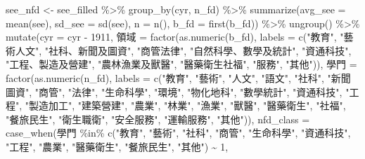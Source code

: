 \documentclass[
]{article}
\newenvironment{Shaded}{\begin{snugshade}}{\end{snugshade}}
\newcommand{\AttributeTok}[1]{\textcolor[rgb]{0.77,0.63,0.00}{#1}}
\newcommand{\DecValTok}[1]{\textcolor[rgb]{0.00,0.00,0.81}{#1}}
\newcommand{\FunctionTok}[1]{\textcolor[rgb]{0.00,0.00,0.00}{#1}}
\newcommand{\NormalTok}[1]{#1}
\newcommand{\OtherTok}[1]{\textcolor[rgb]{0.56,0.35,0.01}{#1}}
\newcommand{\SpecialCharTok}[1]{\textcolor[rgb]{0.00,0.00,0.00}{#1}}
\newcommand{\StringTok}[1]{\textcolor[rgb]{0.31,0.60,0.02}{#1}}
\begin{document}
\begin{Shaded}
\begin{Highlighting}[]
\NormalTok{see\_nfd }\OtherTok{\textless{}{-}}\NormalTok{ see\_filled }\SpecialCharTok{\%\textgreater{}\%}
  \FunctionTok{group\_by}\NormalTok{(cyr, n\_fd) }\SpecialCharTok{\%\textgreater{}\%}
  \FunctionTok{summarize}\NormalTok{(}\AttributeTok{avg\_see =} \FunctionTok{mean}\NormalTok{(see),}
            \AttributeTok{sd\_see =} \FunctionTok{sd}\NormalTok{(see),}
            \AttributeTok{n =} \FunctionTok{n}\NormalTok{(),}
            \AttributeTok{b\_fd =} \FunctionTok{first}\NormalTok{(b\_fd)) }\SpecialCharTok{\%\textgreater{}\%}
  \FunctionTok{ungroup}\NormalTok{() }\SpecialCharTok{\%\textgreater{}\%}
  \FunctionTok{mutate}\NormalTok{(}\AttributeTok{cyr =}\NormalTok{ cyr }\SpecialCharTok{{-}} \DecValTok{1911}\NormalTok{,}
\NormalTok{         領域 }\OtherTok{=} \FunctionTok{factor}\NormalTok{(}\FunctionTok{as.numeric}\NormalTok{(b\_fd), }\AttributeTok{labels =} \FunctionTok{c}\NormalTok{(}\StringTok{"教育"}\NormalTok{, }\StringTok{"藝術人文"}\NormalTok{, }\StringTok{"社科、新聞及圖資"}\NormalTok{, }\StringTok{"商管法律"}\NormalTok{, }\StringTok{"自然科學、數學及統計"}\NormalTok{, }\StringTok{"資通科技"}\NormalTok{, }\StringTok{"工程、製造及營建"}\NormalTok{, }\StringTok{"農林漁業及獸醫"}\NormalTok{, }\StringTok{"醫藥衛生社福"}\NormalTok{, }\StringTok{"服務"}\NormalTok{, }\StringTok{"其他"}\NormalTok{)),}
\NormalTok{         學門 }\OtherTok{=} \FunctionTok{factor}\NormalTok{(}\FunctionTok{as.numeric}\NormalTok{(n\_fd), }\AttributeTok{labels =} \FunctionTok{c}\NormalTok{(}\StringTok{"教育"}\NormalTok{, }\StringTok{"藝術"}\NormalTok{, }\StringTok{"人文"}\NormalTok{, }\StringTok{"語文"}\NormalTok{, }\StringTok{"社科"}\NormalTok{, }\StringTok{"新聞圖資"}\NormalTok{, }\StringTok{"商管"}\NormalTok{, }\StringTok{"法律"}\NormalTok{, }\StringTok{"生命科學"}\NormalTok{, }\StringTok{"環境"}\NormalTok{, }\StringTok{"物化地科"}\NormalTok{, }\StringTok{"數學統計"}\NormalTok{, }\StringTok{"資通科技"}\NormalTok{, }\StringTok{"工程"}\NormalTok{, }\StringTok{"製造加工"}\NormalTok{, }\StringTok{"建築營建"}\NormalTok{, }\StringTok{"農業"}\NormalTok{, }\StringTok{"林業"}\NormalTok{, }\StringTok{"漁業"}\NormalTok{, }\StringTok{"獸醫"}\NormalTok{, }\StringTok{"醫藥衛生"}\NormalTok{, }\StringTok{"社福"}\NormalTok{, }\StringTok{"餐旅民生"}\NormalTok{, }\StringTok{"衛生職衛"}\NormalTok{, }\StringTok{"安全服務"}\NormalTok{, }\StringTok{"運輸服務"}\NormalTok{, }\StringTok{"其他"}\NormalTok{)),}
         \AttributeTok{nfd\_class =} \FunctionTok{case\_when}\NormalTok{(學門 }\SpecialCharTok{\%in\%} \FunctionTok{c}\NormalTok{(}\StringTok{"教育"}\NormalTok{, }\StringTok{"藝術"}\NormalTok{, }\StringTok{"社科"}\NormalTok{, }\StringTok{"商管"}\NormalTok{, }\StringTok{"生命科學"}\NormalTok{, }\StringTok{"資通科技"}\NormalTok{, }\StringTok{"工程"}\NormalTok{, }\StringTok{"農業"}\NormalTok{, }\StringTok{"醫藥衛生"}\NormalTok{, }\StringTok{"餐旅民生"}\NormalTok{, }\StringTok{"其他"}\NormalTok{) }\SpecialCharTok{\textasciitilde{}} \DecValTok{1}\NormalTok{,}

\end{Highlighting}
\end{Shaded}
\end{document}
